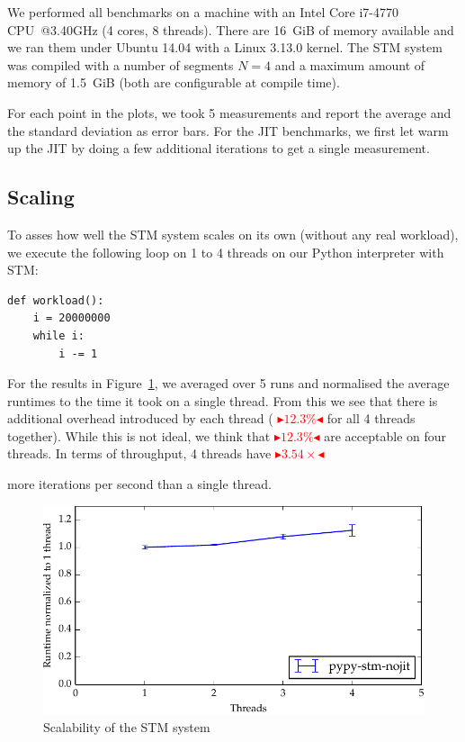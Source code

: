 \documentclass{sigplanconf}
\newcommand{\mynote}[2]{%
  \textcolor{red}{%
    \fbox{\bfseries\sffamily\scriptsize#1}%
    {\small$\blacktriangleright$\textsf{\emph{#2}}$\blacktriangleleft$}%
  }%
}
\newcommand\remi[1]{\mynote{Remi}{#1}}
\begin{document}
We performed all benchmarks on a machine with an Intel Core i7-4770
CPU~@3.40GHz (4 cores, 8 threads).  There are 16~GiB of memory
available and we ran them under Ubuntu 14.04 with a Linux 3.13.0
kernel. The STM system was compiled with a number of segments $N=4$
and a maximum amount of memory of 1.5~GiB (both are configurable at
compile time).

For each point in the plots, we took 5 measurements and report the
average and the standard deviation as error bars. For the JIT
benchmarks, we first let warm up the JIT by doing a few
additional iterations to get a single measurement.



\subsection{Scaling}

To asses how well the STM system scales on its own (without any real
workload), we execute the following loop on 1 to 4 threads on our
Python interpreter with STM:
\begin{lstlisting}
def workload():
    i = 20000000
    while i:
        i -= 1
\end{lstlisting}

For the results in Figure~\ref{fig:scaling}, we averaged over 5 runs
and normalised the average runtimes to the time it took on a single
thread. From this we see that there is additional overhead introduced
by each thread (\remi{$12.3\%$} for all 4 threads together). While this
is not ideal, we think that \remi{$12.3\%$} are acceptable on four
threads. In terms of throughput, 4 threads have \remi{$3.54\times$}
more iterations per second than a single thread.

\begin{figure}[h]
  \centering
  \includegraphics[width=1\columnwidth]{plots/scaling.pdf}
  \caption{Scalability of the STM system\label{fig:scaling}}
\end{figure}
\end{document}

